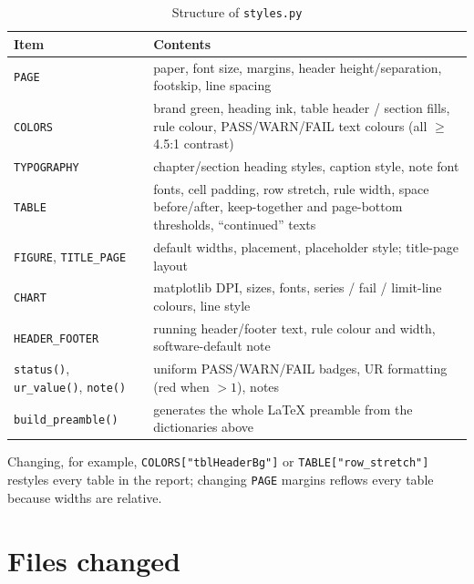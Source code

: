 \documentclass[11pt,a4paper]{article}
\newcommand{\code}[1]{\texttt{\small #1}}
\begin{document}
\begin{table}[H]
\centering\small
\caption{Structure of \code{styles.py}}
\begin{tabularx}{\linewidth}{>{\raggedright\arraybackslash}p{3.2cm}Y}
\toprule
\textbf{Item} & \textbf{Contents}\\
\midrule
\code{PAGE} & paper, font size, margins, header height/separation, footskip, line spacing\\
\code{COLORS} & brand green, heading ink, table header / section fills, rule colour, PASS/WARN/FAIL text colours (all $\geq$4.5:1 contrast)\\
\code{TYPOGRAPHY} & chapter/section heading styles, caption style, note font\\
\code{TABLE} & fonts, cell padding, row stretch, rule width, space before/after, keep-together and page-bottom thresholds, ``continued'' texts\\
\code{FIGURE}, \code{TITLE\_PAGE} & default widths, placement, placeholder style; title-page layout\\
\code{CHART} & matplotlib DPI, sizes, fonts, series / fail / limit-line colours, line style\\
\code{HEADER\_FOOTER} & running header/footer text, rule colour and width, software-default note\\
\code{status()}, \code{ur\_value()}, \code{note()} & uniform PASS/WARN/FAIL badges, UR formatting (red when $>1$), notes\\
\code{build\_preamble()} & generates the whole LaTeX preamble from the dictionaries above\\
\bottomrule
\end{tabularx}
\end{table}

Changing, for example, \code{COLORS["tblHeaderBg"]} or \code{TABLE["row\_stretch"]} restyles every table in the
report; changing \code{PAGE} margins reflows every table because widths are relative.

\section{Files changed}
\end{document}
